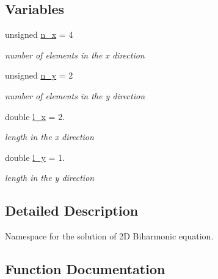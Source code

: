 \subsection*{Variables}
\begin{DoxyCompactItemize}
\item 
unsigned \hyperlink{namespacePhysical__Variables_ae766d6695cfb9a8d87be9767b38245ff}{n\+\_\+x} = 4
\begin{DoxyCompactList}\small\item\em number of elements in the x direction \end{DoxyCompactList}\item 
unsigned \hyperlink{namespacePhysical__Variables_a35801b250816fa72ce9023f8738515fa}{n\+\_\+y} = 2
\begin{DoxyCompactList}\small\item\em number of elements in the y direction \end{DoxyCompactList}\item 
double \hyperlink{namespacePhysical__Variables_af92161eeeab3e15a31698af80f8d09db}{l\+\_\+x} = 2.
\begin{DoxyCompactList}\small\item\em length in the x direction \end{DoxyCompactList}\item 
double \hyperlink{namespacePhysical__Variables_a9f73110ebbfe999c6f09ac797793a537}{l\+\_\+y} = 1.
\begin{DoxyCompactList}\small\item\em length in the y direction \end{DoxyCompactList}\end{DoxyCompactItemize}


\subsection{Detailed Description}
Namespace for the solution of 2D Biharmonic equation. 

\subsection{Function Documentation}
\mbox{\label{namespacePhysical__Variables_af90d0c580c57b1152fd1cc7046055031}} 
